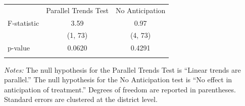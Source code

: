 

\def\sym#1{\ifmmode^{#1}\else\(^{#1}\)\fi}
\renewcommand{\arraystretch}{1.4}
\small
\setlength{\tabcolsep}{15pt}


\vspace{0.2cm}
\begin{flushleft}

\begin{tabular}{@{}p{7.5cm}*{2}{c}@{}}
\hline \hline
\addlinespace[0.5em]
 & Parallel Trends Test & No Anticipation \\
\addlinespace[0.5em]
\midrule
\addlinespace[0.3em]
F-statistic & 3.59 & 0.97 \\
& (1, 73) & (4, 73) \\
\addlinespace[0.2em]
p-value & 0.0620 & 0.4291 \\
\addlinespace[0.3em]
\hline \hline
\end{tabular}
\vspace{3pt}

\begin{tablenotes}
\footnotesize    
\item \textit{Notes:} The null hypothesis for the Parallel Trends Test is ``Linear trends are parallel.'' The null hypothesis for the No Anticipation test is ``No effect in anticipation of treatment.'' Degrees of freedom are reported in parentheses. Standard errors are clustered at the district level.
\end{tablenotes}

\end{flushleft}